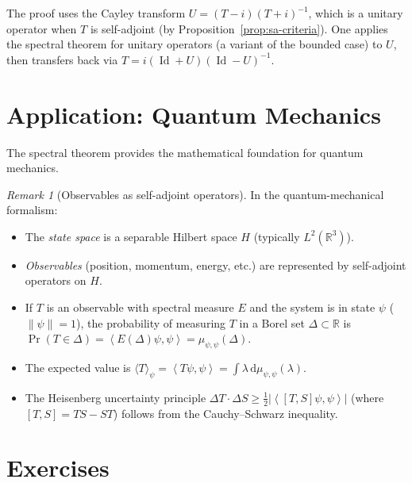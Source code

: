 \documentclass[a4paper,12pt]{book}
\DeclareMathOperator{\Id}{Id}
\newcommand{\R}{\mathbb{R}}
\newcommand{\dd}{\mathrm{d}}
\newcommand{\norm}[1]{\left\| #1 \right\|}
\newcommand{\abs}[1]{\left| #1 \right|}
\newcommand{\inner}[2]{\left\langle #1, #2 \right\rangle}
\theoremstyle{definition}
\theoremstyle{plain}
\theoremstyle{remark}
\newtheorem{remark}[definition]{Remark}
\begin{document}
The proof uses the Cayley transform
$U = (T - i)(T + i)^{-1}$, which is a unitary operator when $T$ is self-adjoint
(by Proposition~\ref{prop:sa-criteria}). One applies the spectral theorem for
unitary operators (a variant of the bounded case) to $U$, then transfers back
via $T = i(\Id + U)(\Id - U)^{-1}$.


\section{Application: Quantum Mechanics}\label{sec:quantum-mech}


The spectral theorem provides the mathematical foundation for quantum mechanics.

\begin{remark}[Observables as self-adjoint operators]
In the quantum-mechanical formalism:
\begin{itemize}
  \item The \emph{state space} is a separable Hilbert space $H$ (typically $L^2(\R^3)$).
  \item \emph{Observables} (position, momentum, energy, etc.) are represented by
        self-adjoint operators on $H$.
  \item If $T$ is an observable with spectral measure $E$ and the system is in
        state $\psi$ ($\norm{\psi} = 1$), the probability of measuring $T$ in a
        Borel set $\Delta \subset \R$ is
        $\Pr(T \in \Delta) = \inner{E(\Delta)\psi}{\psi} = \mu_{\psi,\psi}(\Delta)$.
  \item The expected value is
        $\langle T \rangle_\psi = \inner{T\psi}{\psi} = \int \lambda\, \dd\mu_{\psi,\psi}(\lambda)$.
  \item The Heisenberg uncertainty principle
        $\Delta T \cdot \Delta S \ge \frac{1}{2}\abs{\inner{[T,S]\psi}{\psi}}$
        (where $[T,S] = TS - ST$) follows from the Cauchy--Schwarz inequality.
\end{itemize}
\end{remark}


\section{Exercises}
\end{document}

